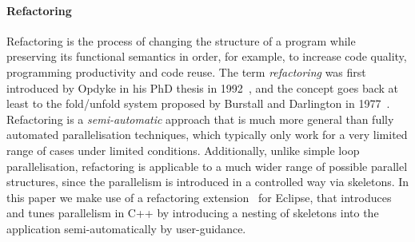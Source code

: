 \documentclass[smallextended]{svjour3}
\begin{document}
\paragraph{Refactoring}
Refactoring is the process of changing the structure of a program
while preserving its functional semantics in order, for example, 
to increase code quality, programming productivity and code reuse.
The term \emph{refactoring} was first introduced by Opdyke in his PhD
thesis in 1992~\cite{opdyke}, and the concept goes back at least to the fold/unfold system proposed
by Burstall and Darlington in 1977~\cite{darlington77}.
Refactoring is a \emph{semi-automatic} approach that is much more
general than fully automated parallelisation techniques, which typically
only work for a very limited range of cases under limited conditions.
Additionally, unlike simple loop parallelisation, refactoring is applicable
to a much wider range of possible parallel structures, since the parallelism is introduced
in a controlled way via skeletons.
In this paper we make use of a refactoring extension~\cite{pdp} for Eclipse, that introduces and tunes parallelism in C++ by introducing a nesting of skeletons into the application semi-automatically by user-guidance.
\end{document}
